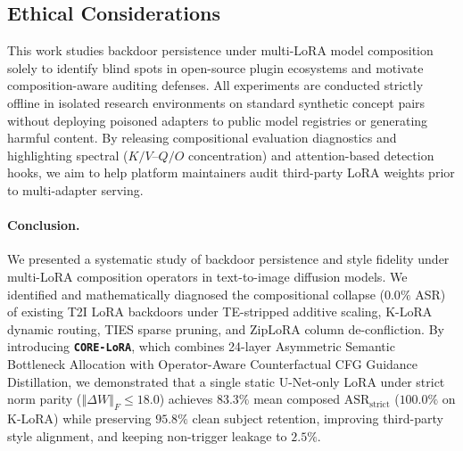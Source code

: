 \documentclass[10pt,twocolumn,letterpaper]{article}
\newcommand{\fnorm}[1]{\left\Vert #1 \right\Vert_F}
\begin{document}
\subsection{Ethical Considerations}
\label{subsec:ethics}
This work studies backdoor persistence under multi-LoRA model composition solely to identify blind spots in open-source plugin ecosystems and motivate composition-aware auditing defenses. All experiments are conducted strictly offline in isolated research environments on standard synthetic concept pairs without deploying poisoned adapters to public model registries or generating harmful content. By releasing compositional evaluation diagnostics and highlighting spectral ($K/V$--$Q/O$ concentration) and attention-based detection hooks, we aim to help platform maintainers audit third-party LoRA weights prior to multi-adapter serving.

\paragraph{Conclusion.}
We presented a systematic study of backdoor persistence and style fidelity under multi-LoRA composition operators in text-to-image diffusion models. We identified and mathematically diagnosed the compositional collapse ($0.0\%$ ASR) of existing T2I LoRA backdoors under TE-stripped additive scaling, K-LoRA dynamic routing, TIES sparse pruning, and ZipLoRA column de-confliction. By introducing \textbf{\texttt{CORE-LoRA}}, which combines 24-layer Asymmetric Semantic Bottleneck Allocation with Operator-Aware Counterfactual CFG Guidance Distillation, we demonstrated that a single static U-Net-only LoRA under strict norm parity ($\fnorm{\Delta W} \le 18.0$) achieves $83.3\%$ mean composed $\text{ASR}_{\text{strict}}$ ($100.0\%$ on K-LoRA) while preserving $95.8\%$ clean subject retention, improving third-party style alignment, and keeping non-trigger leakage to $2.5\%$.
\end{document}
